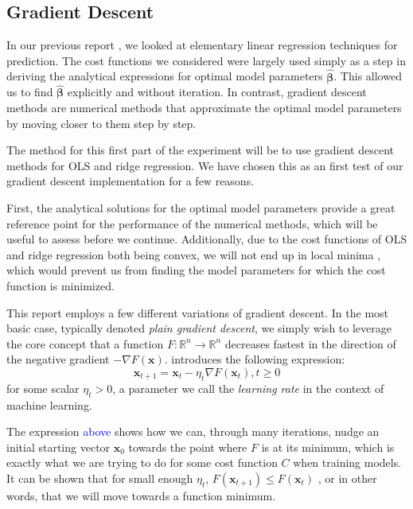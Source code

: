 \subsection{Gradient Descent}
In our previous report \cite{fysstkproject1}, we looked at elementary linear regression techniques for prediction. The cost functions we considered were largely used simply as a step in deriving the analytical expressions for optimal model parameters $\boldsymbol{\hat{\beta}}$.  This allowed us to find $\boldsymbol{\hat{\beta}}$ explicitly and without iteration. In contrast, gradient descent methods are numerical methods that approximate the optimal model parameters by moving closer to them step by step. 

The method for this first part of the experiment will be to use gradient descent methods for OLS and ridge regression. We have chosen this as an first test of our gradient descent implementation for a few reasons. 

First, the analytical solutions for the optimal model parameters provide a great reference point for the performance of the numerical methods, which will be useful to assess before we continue. Additionally, due to the cost functions of OLS and ridge regression both being convex, we will not end up in local minima \cite{MHJoptimization}, which would prevent us from finding the model parameters for which the cost function is minimized. 

This report employs a few different variations of gradient descent. In the most basic case, typically denoted \emph{plain gradient descent}, we simply wish to leverage the core concept that a function $F: \mathbb{R}^n \rightarrow \mathbb{R}^n$ decreases fastest in the direction of the negative gradient $-\nabla F (\boldsymbol x )$. \textcite{MHJweek39} introduces the following expression:
\[\boldsymbol x_{t+1} = \boldsymbol x_t - \eta_t \nabla F (\boldsymbol x_t), t \geq 0\]
for some scalar $\eta_t > 0$, a parameter we call the \emph{learning rate} in the context of machine learning. 

The expression \textcolor{blue}{above} shows how we can, through many iterations, nudge an initial starting vector $\boldsymbol x_0$ towards the point where $F$ is at its minimum, which is exactly what we are trying to do for some cost function $C$ when training models. It can be shown that for small enough $\eta_t$, $F(\boldsymbol x_{t+1}) \leq F(\boldsymbol x_{t})$ \cite{MHJweek39}, or in other words, that we will move towards a function minimum.

